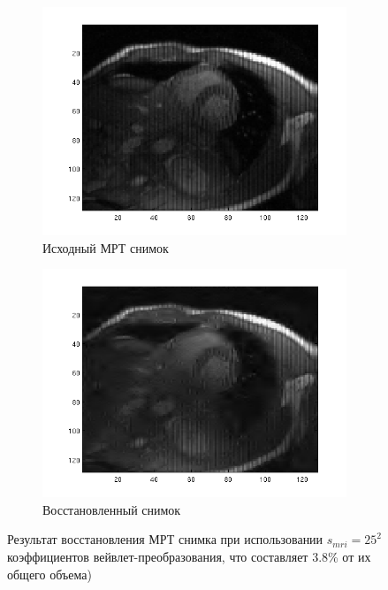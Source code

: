 \documentclass[14pt]{matmex-diploma}
\begin{document}
\begin{figure}[h]
\begin{subfigure}{.45\textwidth}
    \centering
    \includegraphics[width=0.8\linewidth]{pics/coef_rtv_src_img_128.png}
    \caption{Исходный МРТ снимок}
    \label{fig:speedmap_real_src}
\end{subfigure}
\begin{subfigure}{.45\textwidth}
    \centering
    \includegraphics[width=0.8\linewidth]{pics/coef_rtv_result_img_128.png}
    \caption{Восстановленный снимок}
    \label{fig:speedmap_real_dest}
\end{subfigure}

    \caption{Результат восстановления МРТ снимка при использовании $s_{mri}=25^2$ коэффициентов вейвлет-преобразования, что составляет 3.8\% от их общего объема)}
    \label{fig:dwt_result_on_real}
\end{figure}
\end{document}
